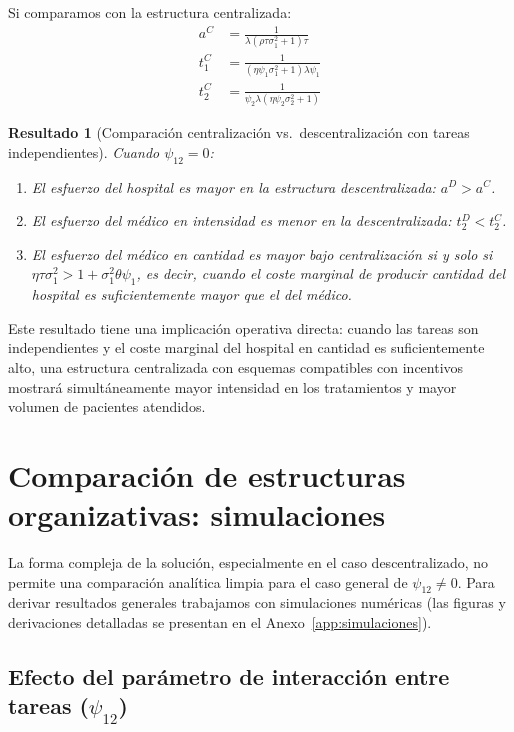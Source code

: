 \documentclass[12pt, a4paper, twoside, openright]{book}
\theoremstyle{plain}
\newtheorem{result}{Resultado}[chapter]
\theoremstyle{definition}
\theoremstyle{remark}
\begin{document}
Si comparamos con la estructura centralizada:
\begin{align}
  a^C &= \frac{1}{\lambda(\rho\tau\sigma_1^2+1)\tau} \label{eq:aC_indep}\\
  t_1^C &= \frac{1}{(\eta\psi_1\sigma_1^2+1)\lambda\psi_1} \label{eq:t1C_indep}\\
  t_2^C &= \frac{1}{\psi_2\lambda(\eta\psi_2\sigma_2^2+1)} \label{eq:t2C_indep}
\end{align}

\begin{result}[Comparación centralización vs.\ descentralización con tareas independientes]
\label{res:comparacion_independientes}
Cuando $\psi_{12}=0$:
\begin{enumerate}[label=(\alph*)]
  \item El esfuerzo del hospital es mayor en la estructura descentralizada: $a^D>a^C$.
  \item El esfuerzo del médico en intensidad es menor en la descentralizada: $t_2^D<t_2^C$.
  \item El esfuerzo del médico en cantidad es mayor bajo centralización si y solo si $\eta\tau\sigma_1^2 > 1+\sigma_1^2\theta\psi_1$, es decir, cuando el coste marginal de producir cantidad del hospital es suficientemente mayor que el del médico.
\end{enumerate}
\end{result}

Este resultado tiene una implicación operativa directa: cuando las tareas son independientes y el coste marginal del hospital en cantidad es suficientemente alto, una estructura centralizada con esquemas compatibles con incentivos mostrará simultáneamente mayor intensidad en los tratamientos y mayor volumen de pacientes atendidos.


\section{Comparación de estructuras organizativas: simulaciones}
\label{sec:simulaciones_resumen}

La forma compleja de la solución, especialmente en el caso descentralizado, no permite una comparación analítica limpia para el caso general de $\psi_{12}\neq 0$. Para derivar resultados generales trabajamos con simulaciones numéricas (las figuras y derivaciones detalladas se presentan en el Anexo~\ref{app:simulaciones}).

\subsection{Efecto del parámetro de interacción entre tareas (\texorpdfstring{$\psi_{12}$}{psi\_12})}
\end{document}
